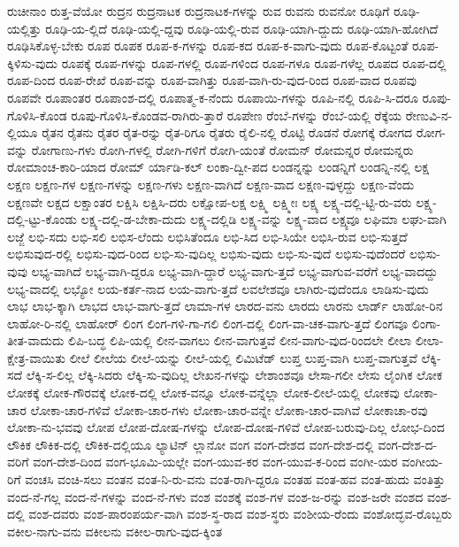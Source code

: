 {ರುಚೀನಾಂ
ರುತ್ತ-ವೆಯೋ
ರುದ್ರನ
ರುದ್ರನಾಟಕ
ರುದ್ರನಾಟಕ-ಗಳನ್ನು
ರುವ
ರುವನು
ರುವನೋ
ರೂಢಿಗೆ
ರೂಢಿ-ಯಲ್ಲಿತ್ತು
ರೂಢಿ-ಯ-ಲ್ಲಿದೆ
ರೂಢಿ-ಯಲ್ಲಿ-ದ್ದವು
ರೂಢಿ-ಯಲ್ಲಿ-ರುವ
ರೂಢಿ-ಯಾಗಿ-ದ್ದುದು
ರೂಢಿ-ಯಾಗಿ-ಹೋಗಿದೆ
ರೂಢಿಸಿಕೊಳ್ಳ-ಬೇಕು
ರೂಪ
ರೂಪಕ
ರೂಪ-ಕ-ಗಳನ್ನು
ರೂಪ-ಕದ
ರೂಪ-ಕ-ವಾಗು-ವುದು
ರೂಪ-ಕೊಟ್ಟಂತೆ
ರೂಪ-ಕ್ಕಿಳಿಸು-ವುದು
ರೂಪಕ್ಕೆ
ರೂಪ-ಗಳನ್ನು
ರೂಪ-ಗಳಲ್ಲಿ
ರೂಪ-ಗಳಿಂದ
ರೂಪ-ಗಳೂ
ರೂಪ-ಗಳೆಲ್ಲ
ರೂಪದ
ರೂಪ-ದಲ್ಲಿ
ರೂಪ-ದಿಂದ
ರೂಪ-ರೇಖೆ
ರೂಪ-ವನ್ನು
ರೂಪ-ವಾಗಿತ್ತು
ರೂಪ-ವಾಗಿ-ರು-ವುದ-ರಿಂದ
ರೂಪ-ವಾದ
ರೂಪವು
ರೂಪವೇ
ರೂಪಾಂತರ
ರೂಪಾಂಶ-ದಲ್ಲಿ
ರೂಪಾತ್ಮ-ಕ-ನೆಂದು
ರೂಪಾಯಿ-ಗಳನ್ನು
ರೂಪಿ-ನಲ್ಲಿ
ರೂಪಿ-ಸಿ-ದರೂ
ರೂಪು-ಗೊಳಿಸಿ-ಕೊಂಡ
ರೂಪು-ಗೊಳಿಸಿ-ಕೊಂಡವ-ರಾಗಿರು-ತ್ತಾರೆ
ರೂಪೇಣ
ರೆಂಬೆ-ಗಳನ್ನು
ರೆಂಬೆ-ಯಲ್ಲಿ
ರೆಕ್ಕೆಯ
ರೇಣುವಿ-ನ-ಲ್ಲಿಯೂ
ರೈತನ
ರೈತನು
ರೈತರ
ರೈತ-ರನ್ನು
ರೈತ-ರಿಗೂ
ರೈತರು
ರೈಲಿ-ನಲ್ಲಿ
ರೊಟ್ಟಿ
ರೊಡನೆ
ರೋಗಕ್ಕೆ
ರೋಗದ
ರೋಗ-ವನ್ನು
ರೋಗಾಣು-ಗಳು
ರೋಗಿ-ಗಳಲ್ಲಿ
ರೋಗಿ-ಗಳಿಗೆ
ರೋಗಿ-ಯಂತೆ
ರೋಮನ್
ರೋಮನ್ನರ
ರೋಮನ್ನರು
ರೋಮಾಂಚ-ಕಾರಿ-ಯಾದ
ರೋಮ್
ರ್ಯಾಡಿ-ಕಲ್
ಲಂಕಾ-ದ್ವೀ-ಪದ
ಲಂಡನ್ನನ್ನು
ಲಂಡನ್ನಿಗೆ
ಲಂಡನ್ನಿ-ನಲ್ಲಿ
ಲಕ್ಷ
ಲಕ್ಷಣ
ಲಕ್ಷಣ-ಗಳ
ಲಕ್ಷಣ-ಗಳನ್ನು
ಲಕ್ಷಣ-ಗಳು
ಲಕ್ಷಣ-ವಾಗಿದೆ
ಲಕ್ಷಣ-ವಾದ
ಲಕ್ಷಣ-ವುಳ್ಳದ್ದು
ಲಕ್ಷಣ-ವೆಂದು
ಲಕ್ಷಣವೇ
ಲಕ್ಷದ
ಲಕ್ಷಾಂತರ
ಲಕ್ಷಿಸಿ
ಲಕ್ಷಿಸಿ-ದರು
ಲಕ್ಷೋಪ-ಲಕ್ಷ
ಲಕ್ಷ್ಮಿ
ಲಕ್ಷ್ಮೀಃ
ಲಕ್ಷ್ಯ
ಲಕ್ಷ್ಯ-ದಲ್ಲಿ-ಟ್ಟಿ-ರು-ವರು
ಲಕ್ಷ್ಯ-ದಲ್ಲಿ-ಟ್ಟು-ಕೊಂಡು
ಲಕ್ಷ್ಯ-ದಲ್ಲಿ-ಡ-ಬೇಕಾ-ದುದು
ಲಕ್ಷ್ಯ-ದಲ್ಲಿಡಿ
ಲಕ್ಷ್ಯ-ವನ್ನು
ಲಕ್ಷ್ಯ-ವಾದ
ಲಕ್ಷ್ಯವೂ
ಲಘಿಮಾ
ಲಘು-ವಾಗಿ
ಲಜ್ಜೆ
ಲಭಿ-ಸದು
ಲಭಿ-ಸಲಿ
ಲಭಿಸ-ಲೆಂದು
ಲಭಿಸಿತೆಂದೂ
ಲಭಿ-ಸಿದ
ಲಭಿ-ಸಿಯೇ
ಲಭಿಸಿ-ರುವ
ಲಭಿ-ಸುತ್ತದೆ
ಲಭಿಸುವುದ-ರಲ್ಲಿ
ಲಭಿಸು-ವುದ-ರಿಂದ
ಲಭಿ-ಸು-ವುದಿಲ್ಲ
ಲಭಿಸು-ವುದು
ಲಭಿ-ಸು-ವುದೆ
ಲಭಿಸು-ವುದೆಂದರೆ
ಲಭಿಸು-ವುವು
ಲಭ್ಯ-ವಾಗಿದೆ
ಲಭ್ಯ-ವಾಗಿ-ದ್ದರೂ
ಲಭ್ಯ-ವಾಗಿ-ದ್ದಾರೆ
ಲಭ್ಯ-ವಾಗು-ತ್ತದೆ
ಲಭ್ಯ-ವಾಗುವ-ವರೆಗೆ
ಲಭ್ಯ-ವಾದದ್ದು
ಲಭ್ಯ-ವಾದಲ್ಲಿ
ಲಭ್ಯೋ
ಲಯ-ಕರ್ತ-ನಾದ
ಲಯ-ವಾಗು-ತ್ತದೆ
ಲವಲೇಶವೂ
ಲಾಗಿರು-ವುದೆಂದೂ
ಲಾಡಿಸು-ವುದು
ಲಾಭ
ಲಾಭ-ಕ್ಕಾಗಿ
ಲಾಭದ
ಲಾಭ-ವಾಗು-ತ್ತದೆ
ಲಾಮಾ-ಗಳ
ಲಾರದ-ವನು
ಲಾರದು
ಲಾರನು
ಲಾರ್ಡ್
ಲಾಹೋ-ರಿನ
ಲಾಹೋ-ರಿ-ನಲ್ಲಿ
ಲಾಹೋರ್
ಲಿಂಗ
ಲಿಂಗ-ಗಳಿ-ಗಾ-ಗಲಿ
ಲಿಂಗ-ದಲ್ಲಿ
ಲಿಂಗ-ವಾ-ಚಕ-ವಾಗು-ತ್ತದೆ
ಲಿಂಗವೂ
ಲಿಂಗಾ-ತೀತ-ವಾದುದು
ಲಿಪಿ-ಬದ್ಧ
ಲಿಪಿ-ಯಲ್ಲಿ
ಲೀನ-ವಾಗಲು
ಲೀನ-ವಾಗುತ್ತವೆ
ಲೀನ-ವಾಗು-ವುದ-ರಿಂದಲೇ
ಲೀಲಾ
ಲೀಲಾ-ಕ್ಷೇತ್ರ-ವಾಯಿತು
ಲೀಲೆ
ಲೀಲೆಯ
ಲೀಲೆ-ಯನ್ನು
ಲೀಲೆ-ಯಲ್ಲಿ
ಲಿಮಿಟೆಡ್
ಲುಪ್ತ
ಲುಪ್ತ-ವಾಗಿ
ಲುಪ್ತ-ವಾಗುತ್ತವೆ
ಲೆಕ್ಕಿ-ಸದೆ
ಲೆಕ್ಕಿ-ಸ-ಲಿಲ್ಲ
ಲೆಕ್ಕಿ-ಸಿದರು
ಲೆಕ್ಕಿ-ಸು-ವುದಿಲ್ಲ
ಲೇಖನ-ಗಳನ್ನು
ಲೇಶಾಂಶವೂ
ಲೇಸಾ-ಗಲೀ
ಲೇಸು
ಲೈಂಗಿಕ
ಲೋಕ
ಲೋಕಕ್ಕೆ
ಲೋಕ-ಗೌರವಕ್ಕೆ
ಲೋಕ-ದಲ್ಲಿ
ಲೋಕ-ವನ್ನೂ
ಲೋಕ-ವನ್ನೆಲ್ಲಾ
ಲೋಕ-ಲೀಲೆ-ಯಲ್ಲಿ
ಲೋಕವು
ಲೋಕಾ-ಚಾರ
ಲೋಕಾ-ಚಾರ-ಗಳಿವೆ
ಲೋಕಾ-ಚಾರ-ಗಳು
ಲೋಕಾ-ಚಾರ-ವನ್ನೇ
ಲೋಕಾ-ಚಾರ-ವಾಗಿವೆ
ಲೋಕಾಚಾ-ರವು
ಲೋಕಾ-ನು-ಭವವು
ಲೋಪ
ಲೋಪ-ದೋಷ-ಗಳನ್ನು
ಲೋಪ-ದೋಷ-ಗಳಿವೆ
ಲೋಪ-ಬರುವು-ದಿಲ್ಲ
ಲೋಭ-ದಿಂದ
ಲೌಕಿಕ
ಲೌಕಿಕ-ದಲ್ಲಿ
ಲೌಕಿಕ-ದಲ್ಲಿಯೂ
ಲ್ಯಾಟಿನ್
ಲ್ಲಾನೋ
ವಂಗ
ವಂಗ-ದೇಶದ
ವಂಗ-ದೇಶ-ದಲ್ಲಿ
ವಂಗ-ದೇಶ-ದ-ವರಿಗೆ
ವಂಗ-ದೇಶ-ದಿಂದ
ವಂಗ-ಭೂಮಿ-ಯಲ್ಲೇ
ವಂಗ-ಯುವ-ಕರ
ವಂಗ-ಯುವ-ಕ-ರಿಂದ
ವಂಗೀ-ಯರ
ವಂಗೀಯ-ರಿಗೆ
ವಂಚಸಿ
ವಂಚಿ-ಸಲು
ವಂತನ
ವಂತ-ನಿ-ರು-ವನು
ವಂತ-ರಾಗಿ-ದ್ದರೂ
ವಂತಹ
ವಂತ-ಹವ
ವಂತ-ಹುದು
ವಂತಿತ್ತು
ವಂದ-ನೆ-ಗಲ್ಲ
ವಂದ-ನೆ-ಗಳನ್ನು
ವಂದ-ನೆ-ಗಳು
ವಂಶ
ವಂಶಕ್ಕೆ
ವಂಶ-ಗಳ
ವಂಶ-ಜ-ರನ್ನು
ವಂಶ-ಜರೇ
ವಂಶದ
ವಂಶ-ದಲ್ಲಿ
ವಂಶ-ದವರು
ವಂಶ-ಪಾರಂಪರ್ಯ-ವಾಗಿ
ವಂಶ-ಸ್ಥ-ರಾದ
ವಂಶ-ಸ್ಥರು
ವಂಶೀಯ-ರೆಂದು
ವಂಶೋದ್ಭವ-ರೊಬ್ಬರು
ವಕೀಲ-ನಾಗು-ವನು
ವಕೀಲನು
ವಕೀಲ-ರಾಗು-ವುದ-ಕ್ಕಿಂತ
}
